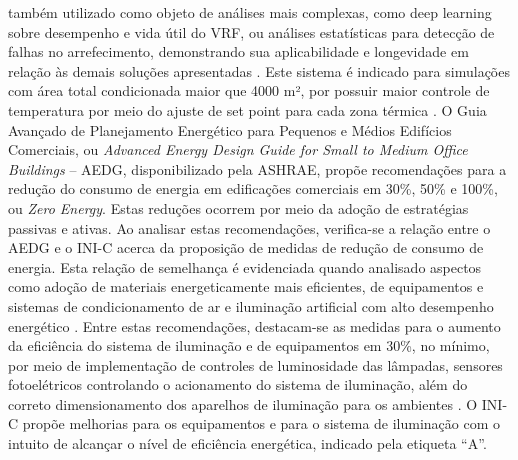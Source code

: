 também utilizado como objeto de análises mais complexas, como deep learning sobre 
desempenho e vida útil do VRF, ou análises estatísticas para detecção de falhas no 
arrefecimento, demonstrando sua aplicabilidade e longevidade em relação às demais 
soluções apresentadas \cite{Cao2016,Guo2018,Liu2010,Teke2014,Wang2014}. 
Este sistema é indicado para simulações com área total condicionada maior que 4000 m², 
por possuir maior controle de temperatura por meio do ajuste de set point para cada zona 
térmica \cite{InstitutoNacionaldeMetrologiaNormalizacaoeQualidadeIndustrial-INMETRO2016}.\vspace*{0.3cm} \newline
\noindent O Guia Avançado de Planejamento Energético para Pequenos e Médios Edifícios Comerciais, 
ou \textit{Advanced Energy Design Guide for Small to Medium Office Buildings} – AEDG, disponibilizado 
pela ASHRAE, propõe recomendações para a redução do consumo de energia em edificações 
comerciais em 30\%, 50\% e 100\%, ou \textit{Zero Energy}. Estas reduções ocorrem por meio da 
adoção de estratégias passivas e ativas.\vspace*{0.3cm} \newline
Ao analisar estas recomendações, verifica-se a relação entre o AEDG e o INI-C acerca da 
proposição de medidas de redução de consumo de energia. Esta relação de semelhança é 
evidenciada quando analisado aspectos como adoção de materiais energeticamente mais 
eficientes, de equipamentos e sistemas de condicionamento de ar e iluminação artificial 
com alto desempenho energético \cite{AmericanSocietyofHeatingRefrigeratingandAir-ConditioningEngineers-ASHRAE2011,AmericanSocietyofHeatingRefrigeratingandAir-ConditioningEngineers-ASHRAE2014,AmericanSocietyofHeatingRefrigeratingandAir-ConditioningEngineers-ASHRAE2019}.\vspace*{0.3cm} \newline
Entre estas recomendações, destacam-se as medidas para o aumento da eficiência do 
sistema de iluminação e de equipamentos em 30\%, no mínimo, por meio de implementação de 
controles de luminosidade das lâmpadas, sensores fotoelétricos controlando o acionamento 
do sistema de iluminação, além do correto dimensionamento dos aparelhos de iluminação 
para os ambientes \cite{AmericanSocietyofHeatingRefrigeratingandAir-ConditioningEngineers-ASHRAE2019}.\vspace*{0.3cm} \newline
O INI-C propõe melhorias para os equipamentos e para o sistema de iluminação com o 
intuito de alcançar o nível de eficiência energética, indicado pela etiqueta “A”. 
